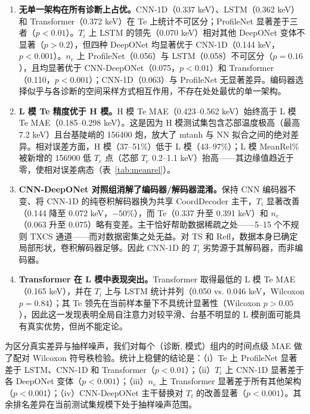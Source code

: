 \documentclass[a4paper,12pt]{ctexart}
\begin{document}
\begin{enumerate}
    \item \textbf{无单一架构在所有诊断上占优。}CNN-1D（0.337 keV）、LSTM（0.362 keV）和 Transformer（0.372 keV）在 Te 上统计不可区分；ProfileNet 显著差于三者（$p<0.01$）。$T_i$ 上 LSTM 的领先（0.070 keV）相对其他 DeepONet 变体不显著（$p>0.2$），但四种 DeepONet 均显著优于 CNN-1D（0.144 keV，$p<0.001$）。$n_e$ 上 ProfileNet（0.056）与 LSTM（0.058）不可区分（$p=0.16$），且均显著优于 CNN-DeepONet（0.075，$p<0.01$）和 Transformer（0.110，$p<0.001$）；CNN-1D（0.063）与 ProfileNet 无显著差异。编码器选择似乎与各诊断的空间采样方式相互作用，不存在处处最优的单一架构。

    \item \textbf{L 模 Te 精度优于 H 模。}H 模 Te MAE（0.423--0.562 keV）始终高于 L 模 Te MAE（0.185--0.298 keV）。这是因为 H 模测试集包含芯部温度极高（最高 7.2 keV）且台基陡峭的 156400 炮，放大了 mtanh 与 NN 拟合之间的绝对差异。相对误差方面，H 模（37--51\%）低于 L 模（43--97\%）；L 模 MeanRel\% 被新增的 156900 低 $T_e$ 点（芯部 $T_e$ 0.2--1.1 keV）抬高——其边缘值趋近于零，使相对误差病态（表~\ref{tab:meanrel}）。

    \item \textbf{CNN-DeepONet 对照组消解了编码器/解码器混淆。}保持 CNN 编码器不变、将 CNN-1D 的纯卷积解码器换为共享 CoordDecoder 主干，$T_i$ 显著改善（0.144 降至 0.072 keV，$-50\%$），而 Te（0.337 升至 0.391 keV）和 $n_e$（0.063 升至 0.075）略有变差。主干恰好帮助数据稀疏之处——5--15 个不规则 TXCS 通道——而对数据密集之处无益。对 TS 和 Refl，数据本身已确定局部形状，卷积解码器足够。因此 CNN-1D 的 $T_i$ 劣势源于其解码器，而非编码器。

    \item \textbf{Transformer 在 L 模中表现突出。}Transformer 取得最低的 L 模 Te MAE（0.165 keV），并在 $T_i$ 上与 LSTM 统计并列（0.050 vs. 0.046 keV，Wilcoxon $p=0.84$）；其 Te 领先在当前样本量下不具统计显著性（Wilcoxon $p>0.05$），因此这一发现表明全局自注意力对较平滑、台基不明显的 L 模剖面可能具有真实优势，但尚不能定论。
\end{enumerate}

为区分真实差异与抽样噪声，我们对每个（诊断, 模式）组内的时间点级 MAE 做了配对 Wilcoxon 符号秩检验。统计上稳健的结论是：（i）Te 上 ProfileNet 显著差于 LSTM、CNN-1D 和 Transformer（$p<0.01$）；（ii）$T_i$ 上 CNN-1D 显著差于各 DeepONet 变体（$p<0.001$）；（iii）$n_e$ 上 Transformer 显著差于所有其他架构（$p<0.001$）；（iv）CNN-DeepONet 主干替换对 $T_i$ 的改善显著（$p<0.001$）。其余排名差异在当前测试集规模下处于抽样噪声范围。
\end{document}
